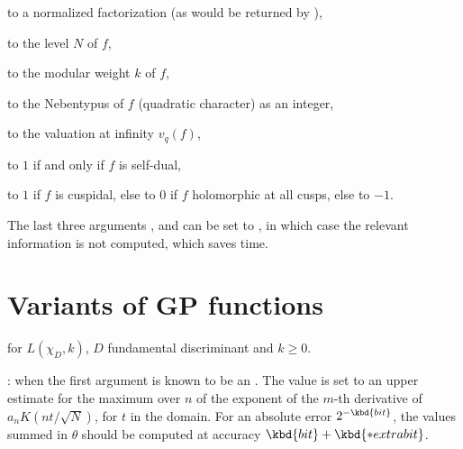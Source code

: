 \item {} to a normalized factorization (as would be returned by
),

\item {} to the level $N$ of $f$,

\item {} to the modular weight $k$ of $f$,

\item {} to the Nebentypus of $f$ (quadratic character)
as an integer,

\item {} to the valuation at infinity $v_q(f)$,

\item {} to $1$ if and only if $f$ is self-dual,

\item {} to $1$ if $f$ is cuspidal, else to $0$ if $f$ holomorphic
at all cusps, else to $-1$.

The last three arguments ,  and  can be set to
, in which case the relevant information is not computed, which
saves time.

\section{Variants of GP functions}





 for $L(\chi_D, k)$, $D$ fundamental
discriminant and $k \geq 0$.

:
  when the first argument is known to be an .
The  value is set to an upper estimate for the maximum over
$n$ of the exponent of the $m$-th derivative of $a_n K(nt/\sqrt{N})$, for $t$
in the  domain. For an absolute error $2^{-\kbd{bit}}$, the values
summed in $\theta$ should be computed at accuracy $\kbd{bit} +
\kbd{*extrabit}$.


